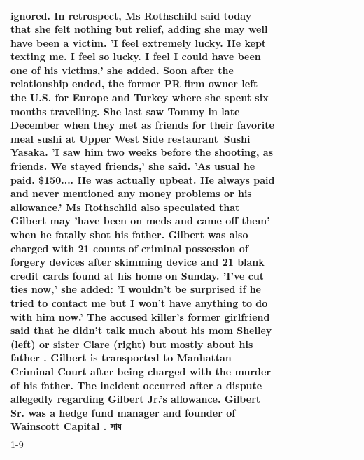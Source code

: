 \begin{table}[H]
\begin{tabular}{lllrlllll}
ignored. In retrospect, Ms Rothschild said today that she felt nothing but relief, adding she may well have been a victim. 'I feel extremely lucky. He kept texting me. I feel so lucky. I feel I could have been one of his victims,' she added. Soon after the relationship ended, the former PR firm owner left the U.S. for Europe and Turkey where she spent six months  travelling. She last saw Tommy in late December when they met as friends for their favorite meal sushi at Upper West Side restaurant Sushi Yasaka. 'I saw him two weeks before the shooting, as friends. We stayed friends,' she said. 'As usual he paid. \$150.... He was actually upbeat. He always paid and never mentioned any money problems or his allowance.' Ms Rothschild also speculated that Gilbert may 'have been on meds and came off them' when he fatally shot his father. Gilbert was also charged with 21 counts of criminal possession of forgery devices after skimming device and 21 blank credit cards found at his home on Sunday. 'I've cut ties now,' she added: 'I wouldn’t be surprised if he tried to contact me but I won’t have anything to do with him now.' The accused killer's former girlfriend said that he didn't talk much about his mom Shelley (left) or sister Clare (right) but mostly about his father . Gilbert is transported to Manhattan Criminal Court  after being charged with the murder of his father. The incident occurred after a dispute allegedly regarding Gilbert Jr.'s allowance. Gilbert Sr. was a hedge fund manager and founder of Wainscott Capital . সাধ \\
\cline{1-9} \cline{2-9}

\end{tabular}
\end{table}
